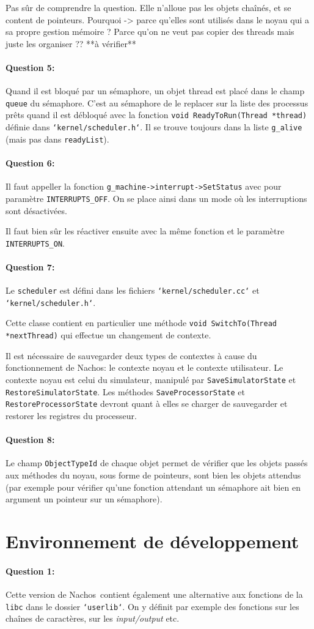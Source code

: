 \documentclass[11pt]{article}
\def\question#1{\paragraph{Question #1:}}
\def\pathfile#1{\texttt{`#1`}}
\def\var#1{\texttt{#1}}
\def\func#1{\texttt{#1}}
\def\obj#1{\texttt{#1}}
\def\comment#1{\color{red}#1\color{black}}
\def\nachos{Nachos}
\begin{document}
\comment{Pas sûr de comprendre la question. Elle n'alloue pas les objets chaînés, et se content de pointeurs. Pourquoi -> parce qu'elles sont utilisés dans le noyau qui a sa propre gestion mémoire ? Parce qu'on ne veut pas copier des threads mais juste les organiser ?? **à vérifier**  }

\question{5} Quand il est bloqué par un sémaphore, un objet thread est placé dans le champ \var{queue} du sémaphore. C'est au sémaphore de le replacer sur la liste des processus prêts quand il est débloqué avec la fonction \func{void ReadyToRun(Thread *thread)} définie dans \pathfile{kernel/scheduler.h}. Il se trouve toujours dans la liste \var{g\_alive} (mais pas dans \var{readyList}).

\question{6} Il faut appeller la fonction \func{g\_machine->interrupt->SetStatus} avec pour paramètre \var{INTERRUPTS\_OFF}. On se place ainsi dans un mode où les interruptions sont désactivées.  

Il faut bien sûr les réactiver ensuite avec la même fonction et le paramètre \var{INTERRUPTS\_ON}.

\question{7}  Le \obj{scheduler} est défini dans les fichiers \pathfile{kernel/scheduler.cc} et \pathfile{kernel/scheduler.h}.

Cette classe contient en particulier une méthode \func{void SwitchTo(Thread *nextThread)} qui effectue un changement de contexte.  

Il est nécessaire de sauvegarder deux types de contextes à cause du fonctionnement de \nachos: le contexte noyau et le contexte utilisateur.  
Le contexte noyau est celui du simulateur, manipulé par \func{SaveSimulatorState} et \func{RestoreSimulatorState}.  
Les méthodes \func{SaveProcessorState} et \func{RestoreProcessorState} devront quant à elles se charger de sauvegarder et restorer les registres du processeur.

\question{8}  Le champ \var{ObjectTypeId} de chaque objet permet de vérifier que les objets passés aux méthodes du noyau, sous forme de pointeurs, sont bien les objets attendus (par exemple pour vérifier qu'une fonction attendant un sémaphore ait bien en argument un pointeur sur un sémaphore).

\section*{Environnement de développement}
\question{1} 
Cette version de \nachos\ contient également une alternative aux fonctions de la \texttt{libc} dans le dossier \pathfile{userlib}. On y définit par exemple des fonctions sur les chaînes de caractères, sur les \textit{input/output} etc.
\end{document}
